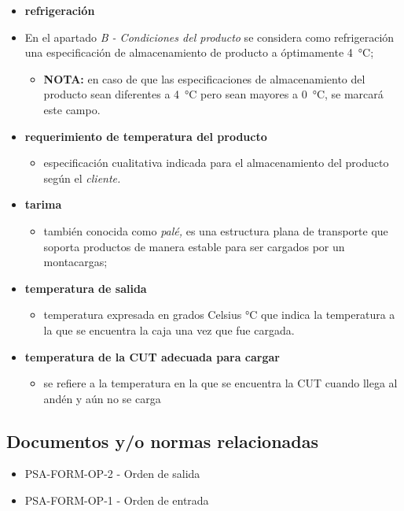 \begin{itemize}
\begin{itemize}
	\end{itemize}
	\item \textbf{refrigeración}
	\item En el apartado \emph{B - Condiciones del producto} se considera como refrigeración una especificación de almacenamiento de producto a óptimamente \SI{4}{\celsius};
	\begin{itemize}
		\item \textbf{NOTA:} en caso de que las especificaciones de almacenamiento del producto sean diferentes a \SI{4}{\celsius} pero sean mayores a \SI{0}{\celsius}, se marcará este campo.
	\end{itemize}
	\item \textbf{requerimiento de temperatura del producto}
	\begin{itemize}
		\item especificación cualitativa indicada para el almacenamiento del producto según el \emph{cliente.}
	\end{itemize}
	\item \textbf{tarima}
	\begin{itemize}
		\item también conocida como \emph{palé,} es una estructura plana de transporte que soporta productos de manera estable para ser cargados por un montacargas;
	\end{itemize}
	\item \textbf{temperatura de salida}
	\begin{itemize}
		\item temperatura expresada en grados Celsius \si{\celsius} que indica la temperatura a la que se encuentra la caja una vez que fue cargada.
	\end{itemize}
	\item \textbf{temperatura de la CUT adecuada para cargar}
	\begin{itemize}
		\item se refiere a la temperatura en la que se encuentra la CUT cuando llega al andén y aún no se carga
	\end{itemize}
\end{itemize}

\subsection{Documentos y/o normas relacionadas}

\begin{itemize}
	\item PSA-FORM-OP-2 - Orden de salida
	\item PSA-FORM-OP-1 - Orden de entrada
\end{itemize}

